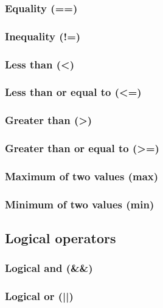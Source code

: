 \documentclass{article}
\theoremstyle{definition}
\begin{document}
\subsubsection{Equality (==)}
\libfcn{==}

\subsubsection{Inequality (!=)}
\libfcn{!=}

\subsubsection{Less than (<)}
\libfcn{<}

\subsubsection{Less than or equal to (<=)}
\libfcn{<=}

\subsubsection{Greater than (>)}
\libfcn{>}

\subsubsection{Greater than or equal to (>=)}
\libfcn{>=}

\subsubsection{Maximum of two values (max)}

\subsubsection{Minimum of two values (min)}

\subsection{Logical operators}

\subsubsection{Logical and (\&\&)}
\libfcn{\&\&}

\subsubsection{Logical or (||)}
\libfcn{||}
\end{document}
